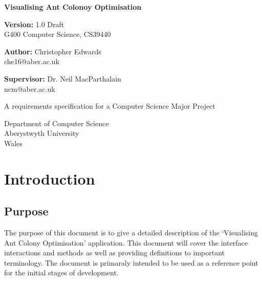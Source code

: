 \documentclass[10pt,a4paper]{article}
\begin{document}
\begin{titlepage}
    \begin{center}
        \vspace{1cm}
        
        \Huge
        \textbf{Visualising Ant Colonoy Optimisation}
        
	 \vspace{0.5cm}
        \Large
	 \textbf{Version:} 1.0 Draft \\
        G400  Computer Science, CS39440
	  

        \vspace{1.0cm}
        
	  \Large
        \textbf{Author:} Christopher Edwards \\
         che16@aber.ac.uk

 	  \vspace{0.8cm}
 	  \textbf{Supervisor:} Dr. Neil MacParthalain \\
         ncm@aber.ac.uk
        
        \vspace{3.0cm}
        
        A requirements  specification for a Computer Science Major Project
                
        \vspace{0.8cm}
                
        \Large
        Department of Computer Science\\
        Aberystwyth University\\
        Wales\\
        
        
	\end{center}
\end{titlepage}


\section{Introduction}

\subsection{Purpose}

The purpose of this document is to give a detailed description of the `Visualising Ant Colony Optimisation' application. This document will cover the interface interactions and methods as well as providing definitions to important terminology. The document is primaraly intended to be used as a reference point for the initial stages of development.
\end{document}
